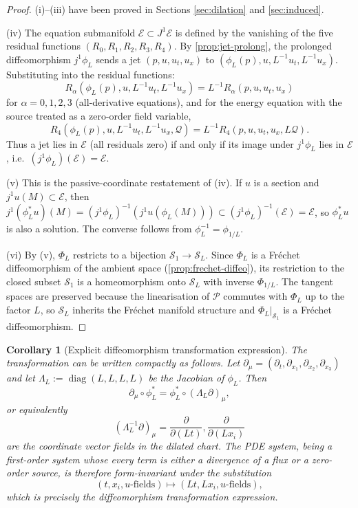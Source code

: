 \documentclass[11pt]{article}
\newtheorem{corollary}[theorem]{Corollary}
\theoremstyle{definition}
\theoremstyle{remark}
\newcommand{\E}{\mathcal{E}}
\begin{document}
\begin{proof}
(i)--(iii) have been proved in Sections \ref{sec:dilation} and \ref{sec:induced}.

(iv) The equation submanifold $\mathcal E\subset J^1\E$ is defined by the
vanishing of the five residual functions
$(R_0,R_1,R_2,R_3,R_4)$.  By \ref{prop:jet-prolong}, the prolonged
diffeomorphism $j^1\phi_L$ sends a jet $(p,u,u_t,u_x)$ to
$(\phi_L(p),u,L^{-1}u_t,L^{-1}u_x)$.  Substituting into the residual
functions:
\[
R_\alpha(\phi_L(p),u,L^{-1}u_t,L^{-1}u_x)
=L^{-1}R_\alpha(p,u,u_t,u_x)
\]
for $\alpha=0,1,2,3$ (all-derivative equations), and for the energy equation
with the source treated as a zero-order field variable,
\[
R_4(\phi_L(p),u,L^{-1}u_t,L^{-1}u_x,\mathcal Q)
=L^{-1}R_4(p,u,u_t,u_x,L\mathcal Q).
\]
Thus a jet lies in $\mathcal E$ (all residuals zero) if and only if its image
under $j^1\phi_L$ lies in $\mathcal E$, i.e.\ $(j^1\phi_L)(\mathcal E)=
\mathcal E$.

(v) This is the passive-coordinate restatement of (iv).  If $u$ is a section
and $j^1u(M)\subset\mathcal E$, then $j^1(\phi_L^*u)(M)=(j^1\phi_L)^{-1}
(j^1u(\phi_L(M)))\subset(j^1\phi_L)^{-1}(\mathcal E)=\mathcal E$, so
$\phi_L^*u$ is also a solution.  The converse follows from
$\phi_L^{-1}=\phi_{1/L}$.

(vi) By (v), $\Phi_L$ restricts to a bijection $\mathcal S_1\to\mathcal S_L$.
Since $\Phi_L$ is a Fr\'echet diffeomorphism of the ambient space
(\ref{prop:frechet-diffeo}), its restriction to the closed subset
$\mathcal S_1$ is a homeomorphism onto $\mathcal S_L$ with inverse
$\Phi_{1/L}$.  The tangent spaces are preserved because the linearisation of
$\mathcal P$ commutes with $\Phi_L$ up to the factor $L$, so $\mathcal S_L$
inherits the Fr\'echet manifold structure and $\Phi_L|_{\mathcal S_1}$ is a
Fr\'echet diffeomorphism.
\end{proof}

\begin{corollary}[Explicit diffeomorphism transformation expression]
The transformation can be written compactly as follows.  Let
$\partial_\mu=(\partial_t,\partial_{x_1},\partial_{x_2},\partial_{x_3})$ and
let $\Lambda_L:=\operatorname{diag}(L,L,L,L)$ be the Jacobian of $\phi_L$.
Then
\[
\partial_\mu\circ\phi_L^*=\phi_L^*\circ(\Lambda_L\partial)_\mu,
\]
or equivalently
\[
(\Lambda_L^{-1}\partial)_\mu=\frac{\partial}{\partial(Lt)},\frac{\partial}{\partial(Lx_i)}
\]
are the coordinate vector fields in the dilated chart.  The PDE system, being
a first-order system whose every term is either a divergence of a flux or a
zero-order source, is therefore \emph{form-invariant} under the substitution
\[
(t,x_i,u\text{-fields})\longmapsto(Lt,Lx_i,u\text{-fields}),
\]
which is precisely the diffeomorphism transformation expression.
\end{corollary}
\end{document}
